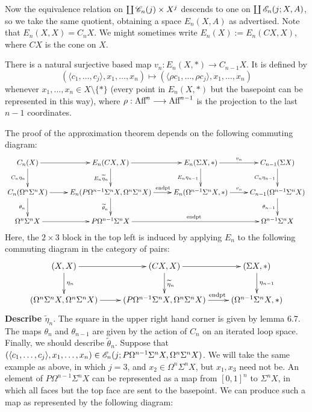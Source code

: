 \documentclass[11pt]{article}
\newcommand{\Aff}{\textup{Aff}}
\begin{document}
\begin{chapter4-6}
\begin{center}
\begin{tikzpicture}[scale=.5]
\end{tikzpicture}
\end{center}
Now the equivalence relation on $\coprod \scrC_n(j)\times X^j$ descends to one on  $\coprod \scrE_n(j;X,A)$, so we take the same quotient, obtaining a space $E_n(X,A)$ as advertised. Note that $E_n(X,X)=C_nX$. We might sometimes write $E_n(X):=E_n(CX,X)$, where $CX$ is the cone on $X$.
\begin{lem*}[6.7]
There is a natural surjective based map $v_n:E_n(X,*)\to C_{n-1}X$. It is defined by 
\[(\langle c_1,\ldots,c_j\rangle,x_1,\ldots,x_n)\mapsto (\langle \rho c_1,\ldots,\rho c_j\rangle,x_1,\ldots,x_n)\]
whenever $x_1,\ldots,x_n\in X\setminus\{*\}$ (every point in $E_n(X,*)$ but the basepoint can be represented in this way), where $\rho:\Aff^n\to\Aff^{n-1}$ is the projection to the last $n-1$ coordinates.
\end{lem*}
The proof of the approximation theorem depends on the following commuting diagram:
\[\xymatrix{
C_n(X)\ar[r]\ar[d]_{C_n\eta_n}&
E_n(CX,X)\ar[d]_{E_n\widetilde{\eta}_n}\ar[r]&
E_n(\Sigma X,*)\ar[r]^{v_n}\ar[d]_{E_n\eta_{n-1}}&
C_{n-1}(\Sigma X)\ar[d]_{C_n\eta_{n-1}}\\
C_n(\Omega^n\Sigma^nX)\ar[r]\ar[d]_{\theta_n}&
E_n(P\Omega^{n-1}\Sigma^nX,\Omega^{n}\Sigma^nX)
\ar[r]^{\qquad \textup{endpt}}\ar[d]_{\widetilde{\theta}_n}&
E_n(\Omega^{n-1}\Sigma^nX,*)\ar[r]^{v_n}&
C_{n-1}(\Omega^{n-1}\Sigma^nX)\ar[d]_{\theta_{n-1}}\\
\Omega^n\Sigma^nX\ar[r]&
P\Omega^{n-1}\Sigma^nX\ar[rr]^{\textup{endpt}}&&
\Omega^{n-1}\Sigma^nX
}\]
Here, the $2\times3$ block in the top left is induced by applying $E_n$ to the following commuting diagram in the category of pairs:
\[\xymatrix{
(X,X)\ar[r]\ar[d]^{\eta_n}&
(CX,X)\ar[r]\ar[d]^{\widetilde{\eta}_n}&
(\Sigma X,*)\ar[d]^{\eta_{n-1}}\\
(\Omega^n\Sigma^nX,\Omega^n\Sigma^nX)\ar[r]&
(P\Omega^{n-1}\Sigma^nX,\Omega^n\Sigma^nX)\ar[r]^{\textup{\qquad endpt}}&
(\Omega^{n-1}\Sigma^nX,*)
}\]
\textbf{Describe $\widetilde{\eta}_{n}$}. The square in the upper right hand corner is given by lemma 6.7. The maps $\theta_n$ and $\theta_{n-1}$ are given by the action of $C_n$ on an iterated loop space. Finally, we should describe $\widetilde{\theta}_n$. Suppose that $(\langle c_1,\ldots,c_j\rangle,x_1,\ldots,x_n)\in\scrE_n(j;P\Omega^{n-1}\Sigma^nX,\Omega^n\Sigma^nX)$. We will take the same example as above, in which $j=3$, and $x_2\in \Omega^n\Sigma^n X$, but $x_1,x_3$ need not be. An element of $P\Omega^{n-1}\Sigma^nX$ can be represented as a map from $[0,1]^{n}$ to $\Sigma^nX$, in which all faces but the top face are sent to the basepoint. We can produce such a map as represented by the following diagram:

\end{chapter4-6}
\end{document}
